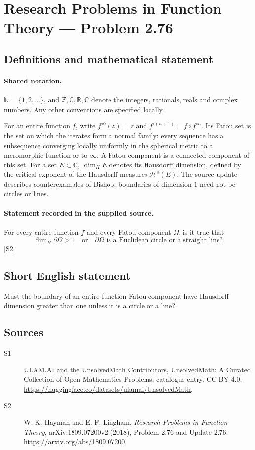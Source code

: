 \documentclass[11pt]{article}
\newcommand{\sref}[2]{\hyperlink{source:#1:#2}{[S#2]}}
\begin{document}
\section{Research Problems in Function Theory — Problem 2.76}\label{statement}

\subsection{Definitions and mathematical statement}

\paragraph{Shared notation.}$\mathbb N=\{1,2,\ldots\}$, and $\mathbb Z,\mathbb Q,\mathbb R,\mathbb C$ denote the integers, rationals, reals and complex numbers. Any other conventions are specified locally.


For an entire function $f$, write $f^{\circ0}(z)=z$ and $f^{\circ(n+1)}=f\circ f^{\circ n}$. Its Fatou set is the set on which the iterates form a normal family: every sequence has a subsequence converging locally uniformly in the spherical metric to a meromorphic function or to $\infty$. A Fatou component is a connected component of this set. For a set $E\subset\mathbb C$, $\dim_H E$ denotes its Hausdorff dimension, defined by the critical exponent of the Hausdorff measures $\mathcal H^s(E)$.
The source update describes counterexamples of Bishop: boundaries of dimension $1$ need not be circles or lines.
\paragraph{Statement recorded in the supplied source.}
For every entire function $f$ and every Fatou component $\Omega$, is it true that
\[\dim_H\partial\Omega>1\quad\text{or}\quad\partial\Omega\text{ is a Euclidean circle or a straight line}?\] \sref{statement}{2}
\subsection{Short English statement}
Must the boundary of an entire-function Fatou component have Hausdorff dimension greater than one unless it is a circle or a line?
\subsection{Sources}
\begin{description}
\item[\hypertarget{source:statement:1}{S1}] ULAM.AI and the UnsolvedMath Contributors, UnsolvedMath: A Curated Collection of Open Mathematics Problems, catalogue entry. CC BY 4.0. \url{https://huggingface.co/datasets/ulamai/UnsolvedMath}.
\item[\hypertarget{source:statement:2}{S2}] W. K. Hayman and E. F. Lingham, \emph{Research Problems in Function Theory}, arXiv:1809.07200v2 (2018), Problem 2.76 and Update 2.76. \url{https://arxiv.org/abs/1809.07200}.
\end{description}
\label{end:statement}
\end{document}
